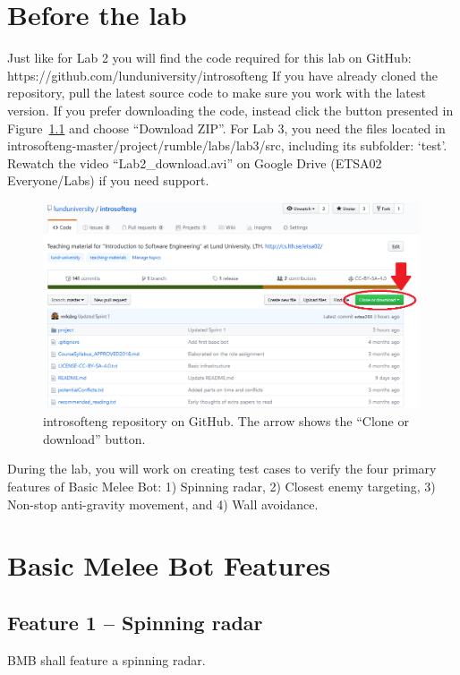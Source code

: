 \documentclass{scrreprt}
\begin{document}
\chapter{Before the lab}
Just like for Lab 2 you will find the code required for this lab on GitHub:\\https://github.com/lunduniversity/introsofteng
If you have already cloned the repository, pull the latest source code to make sure you work with the latest version. If you prefer downloading the code, instead click the button presented in Figure~\ref{fig:github} and choose ``Download ZIP''. For Lab 3, you need the files located in introsofteng-master/project/rumble/labs/lab3/src, including its subfolder: `test'. Rewatch the video ``Lab2_download.avi'' on Google Drive (ETSA02 Everyone/Labs) if you need support.

\begin{figure}
\centering
\includegraphics[width=0.99\textwidth]{figures/GitHub.png}
\caption{introsofteng repository on GitHub. The arrow shows the ``Clone or download'' button.}
\label{fig:github}
\end{figure}


During the lab, you will work on creating test cases to verify the four primary features of Basic Melee Bot: 1) Spinning radar, 2) Closest enemy targeting, 3) Non-stop anti-gravity movement, and 4) Wall avoidance.

\chapter{Basic Melee Bot Features}

\section{Feature 1 -- Spinning radar}
BMB shall feature a spinning radar.
\end{document}
